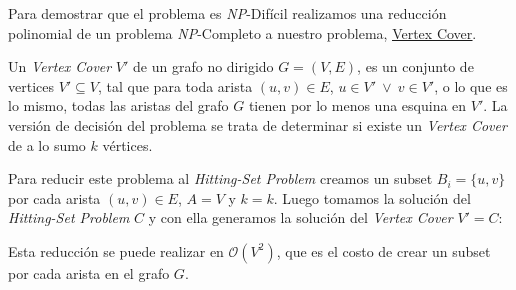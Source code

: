 Para demostrar que el problema es \textit{NP}-Difícil realizamos una reducción
polinomial de un problema \textit{NP}-Completo a nuestro problema,
\href{https://en.wikipedia.org/wiki/Vertex_cover}{\underline{Vertex Cover}}.

Un \textit{Vertex Cover} $V'$ de un grafo no dirigido $G = (V, E)$, es un
conjunto de vertices $V' \subseteq V$, tal que para toda arista $(u, v) \in E$,
$u \in V'\ \lor\ v \in V'$, o lo que es lo mismo, todas las aristas del grafo
$G$ tienen por lo menos una esquina en $V'$. La versión de decisión del
problema se trata de determinar si existe un \textit{Vertex Cover} de a lo sumo
$k$ vértices.

Para reducir este problema al \textit{Hitting-Set Problem} creamos un subset
$B_i = \{ u, v \}$ por cada arista $(u, v) \in E$, $A = V$ y $k = k$. Luego
tomamos la solución del \textit{Hitting-Set Problem} $C$ y con ella generamos
la solución del \textit{Vertex Cover} $V' = C$:



Esta reducción se puede realizar en $\mathcal{O}(V^2)$, que es el costo de
crear un subset por cada arista en el grafo $G$.
